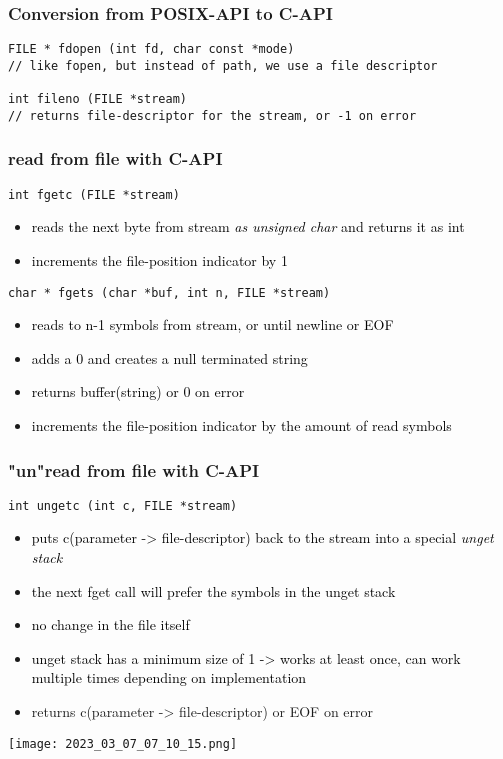 \documentclass[main.tex,fontsize=8pt,paper=a4,paper=portrait,DIV=calc,]{scrartcl}
\begin{document}
\subsubsection{Conversion from POSIX-API to C-API}
\begin{lstlisting}
FILE * fdopen (int fd, char const *mode)
// like fopen, but instead of path, we use a file descriptor

int fileno (FILE *stream)
// returns file-descriptor for the stream, or -1 on error
\end{lstlisting}

\subsubsection{read from file with C-API}
\begin{lstlisting}
int fgetc (FILE *stream)
\end{lstlisting}
\begin{itemize}
  \item \textcolor{black}{reads the next byte from stream \emph{as unsigned char} and returns it as int}
\item \textcolor{black}{increments the file-position indicator by 1}
\end{itemize} 
\begin{lstlisting}
char * fgets (char *buf, int n, FILE *stream)
\end{lstlisting}
\begin{itemize}
\item \textcolor{black}{reads to n-1 symbols from stream, or until newline or EOF}
\item \textcolor{black}{adds a 0 and creates a null terminated string}
\item \textcolor{black}{returns buffer(string) or 0 on error}
\item \textcolor{black}{increments the file-position indicator by the amount of read symbols}
\end{itemize} 

\subsubsection{"un"read from file with C-API}
\begin{lstlisting}
int ungetc (int c, FILE *stream)
\end{lstlisting}
\begin{itemize}
  \item \textcolor{black}{puts c(parameter -> file-descriptor) back to the stream into a special \emph{unget stack}}
\item \textcolor{black}{the next fget call will prefer the symbols in the unget stack}
\item \textcolor{black}{no change in the file itself}
\item \textcolor{black}{unget stack has a minimum size of 1 -> works at least once, can work multiple times depending on implementation}
\item returns c(parameter -> file-descriptor) or EOF on error
\end{itemize} 
\texttt{[image: 2023\_03\_07\_07\_10\_15.png]}
\end{document}
